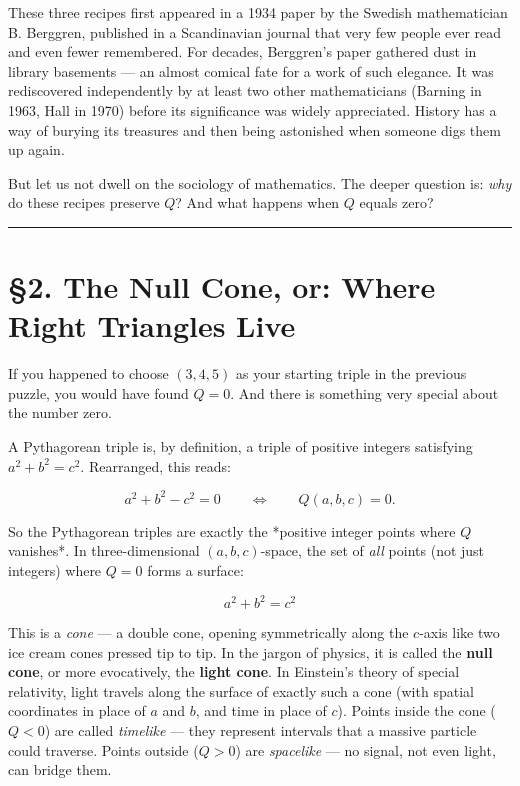 \documentclass[12pt, letterpaper, openany]{book}
\theoremstyle{definition}
\theoremstyle{remark}
\begin{document}
These three recipes first appeared in a 1934 paper by the Swedish mathematician B. Berggren, published in a Scandinavian journal that very few people ever read and even fewer remembered. For decades, Berggren's paper gathered dust in library basements --- an almost comical fate for a work of such elegance. It was rediscovered independently by at least two other mathematicians (Barning in 1963, Hall in 1970) before its significance was widely appreciated. History has a way of burying its treasures and then being astonished when someone digs them up again.

But let us not dwell on the sociology of mathematics. The deeper question is: \textit{why} do these recipes preserve $Q$? And what happens when $Q$ equals zero?


\bigskip\noindent\rule{\textwidth}{0.4pt}\bigskip



\section*{§2. The Null Cone, or: Where Right Triangles Live}


If you happened to choose $(3, 4, 5)$ as your starting triple in the previous puzzle, you would have found $Q = 0$. And there is something very special about the number zero.

A Pythagorean triple is, by definition, a triple of positive integers satisfying $a^2 + b^2 = c^2$. Rearranged, this reads:

\[
a^2 + b^2 - c^2 = 0 \qquad\Longleftrightarrow\qquad Q(a, b, c) = 0.
\]

So the Pythagorean triples are exactly the *positive integer points where $Q$ vanishes*. In three-dimensional $(a, b, c)$-space, the set of \textit{all} points (not just integers) where $Q = 0$ forms a surface:

\[
a^2 + b^2 = c^2
\]

This is a \textit{cone} --- a double cone, opening symmetrically along the $c$-axis like two ice cream cones pressed tip to tip. In the jargon of physics, it is called the \textbf{null cone}, or more evocatively, the \textbf{light cone}. In Einstein's theory of special relativity, light travels along the surface of exactly such a cone (with spatial coordinates in place of $a$ and $b$, and time in place of $c$). Points inside the cone ($Q < 0$) are called \textit{timelike} --- they represent intervals that a massive particle could traverse. Points outside ($Q > 0$) are \textit{spacelike} --- no signal, not even light, can bridge them.
\end{document}
